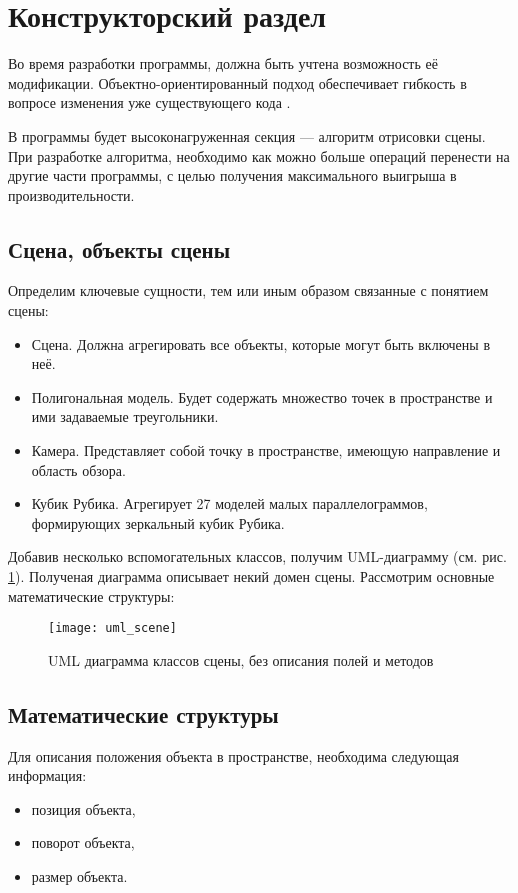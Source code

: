 \section{Конструкторский раздел}
Во время разработки программы, должна быть учтена возможность её модификации. Объектно-ориентированный подход обеспечивает гибкость в вопросе изменения уже существующего кода \cite{bib:oop_mod}.

В программы будет высоконагруженная секция --- алгоритм отрисовки сцены. При разработке алгоритма, необходимо как можно больше операций перенести на другие части программы, с целью получения максимального выигрыша в производительности.

\subsection{Сцена, объекты сцены}
Определим ключевые сущности, тем или иным образом связанные с понятием сцены:
\begin{itemize}
	\item Сцена. Должна агрегировать все объекты, которые могут быть включены в неё.
	\item Полигональная модель. Будет содержать множество точек в пространстве и ими задаваемые треугольники.
	\item Камера. Представляет собой точку в пространстве, имеющую направление и область обзора.
	\item Кубик Рубика. Агрегирует 27 моделей малых параллелограммов, формирующих зеркальный кубик Рубика.
\end{itemize}

Добавив несколько вспомогательных классов, получим UML-диаграмму (см. рис. \ref{fig:uml_scene}). Полученая диаграмма описывает некий домен сцены. Рассмотрим основные математические структуры:
\begin{figure}[ht]
	\centering
	\texttt{[image: uml\_scene]}
	\caption{UML диаграмма классов сцены, без описания полей и методов}
	\label{fig:uml_scene}
\end{figure}

\subsection{Математические структуры}
Для описания положения объекта в пространстве, необходима следующая информация:
\begin{itemize}
	\item позиция объекта,
	\item поворот объекта,
	\item размер объекта.
\end{itemize}

